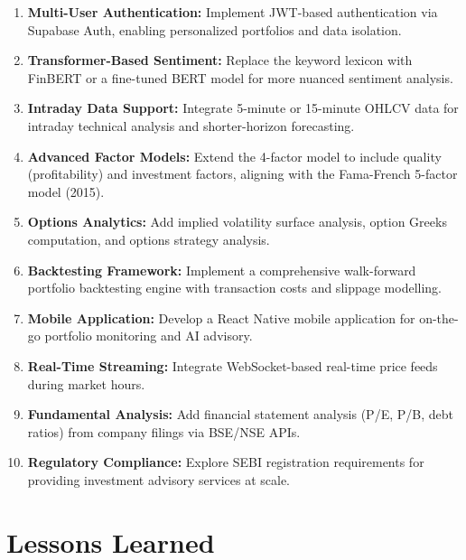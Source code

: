 \documentclass[12pt, a4paper, oneside]{report}
\begin{document}
\begin{enumerate}[nosep]
    \item \textbf{Multi-User Authentication:} Implement JWT-based authentication via Supabase Auth, enabling personalized portfolios and data isolation.

    \item \textbf{Transformer-Based Sentiment:} Replace the keyword lexicon with FinBERT or a fine-tuned BERT model for more nuanced sentiment analysis.

    \item \textbf{Intraday Data Support:} Integrate 5-minute or 15-minute OHLCV data for intraday technical analysis and shorter-horizon forecasting.

    \item \textbf{Advanced Factor Models:} Extend the 4-factor model to include quality (profitability) and investment factors, aligning with the Fama-French 5-factor model (2015).

    \item \textbf{Options Analytics:} Add implied volatility surface analysis, option Greeks computation, and options strategy analysis.

    \item \textbf{Backtesting Framework:} Implement a comprehensive walk-forward portfolio backtesting engine with transaction costs and slippage modelling.

    \item \textbf{Mobile Application:} Develop a React Native mobile application for on-the-go portfolio monitoring and AI advisory.

    \item \textbf{Real-Time Streaming:} Integrate WebSocket-based real-time price feeds during market hours.

    \item \textbf{Fundamental Analysis:} Add financial statement analysis (P/E, P/B, debt ratios) from company filings via BSE/NSE APIs.

    \item \textbf{Regulatory Compliance:} Explore SEBI registration requirements for providing investment advisory services at scale.
\end{enumerate}

\section{Lessons Learned}
\label{sec:lessons}
\end{document}
